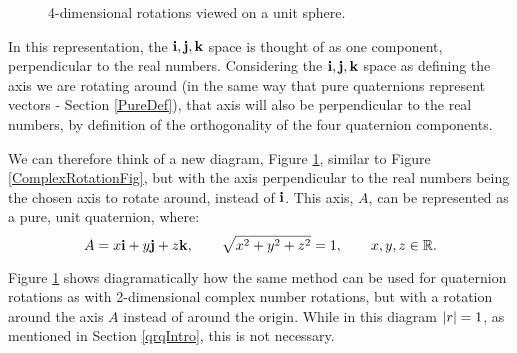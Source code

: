 \documentclass[10pt]{article}
\begin{document}
\begin{figure}[ht]
    \centering
    \caption{4-dimensional rotations viewed on a unit sphere.}
    \label{4DRotationsLike2DFig}
\end{figure}

In this representation, the $\vb{i,j,k}$ space is thought of as one component, perpendicular to the real numbers. Considering the $\vb{i,j,k}$ space as defining the axis we are rotating around (in the same way that pure quaternions represent vectors - Section \ref{PureDef}), that axis will also be perpendicular to the real numbers, by definition of the orthogonality of the four quaternion components.

We can therefore think of a new diagram, Figure \ref{4DRotationsLike2DFig}, similar to Figure \ref{ComplexRotationFig}, but with the axis perpendicular to the real numbers being the chosen axis to rotate around, instead of $\vb{i}$. This axis, $A$, can be represented as a pure, unit quaternion, where:
\begin{equation}
    A = x\vb{i} + y\vb{j} + z\vb{k}, \quad\quad
    \sqrt{x^2 + y^2 + z^2} = 1, \quad\quad
    x, y, z \in \mathbb{R}.
\end{equation}

Figure \ref{4DRotationsLike2DFig} shows diagramatically how the same method can be used for quaternion rotations as with 2-dimensional complex number rotations, but with a rotation around the axis $A$ instead of around the origin. While in this diagram $\abs{r} = 1$, as mentioned in Section \ref{qrqIntro}, this is not necessary.
\end{document}
